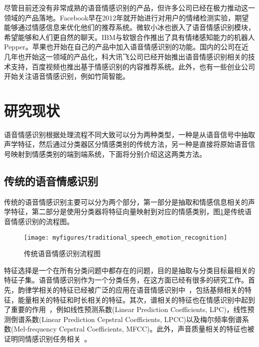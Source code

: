 尽管目前还没有非常成熟的语音情感识别的产品，但许多公司已经在极力推动这一领域的产品落地。Facebook早在2012年就开始进行对用户的情绪检测实验，期望能够通过情感信息来优化他们的推荐系统。微软小冰也嵌入了语音情感识别模块，希望能够和人们更自然的聊天。IBM与软银合作推出了具有情绪感知能力的机器人Pepper。苹果也开始在自己的产品中加入语音情感识别的功能。国内的公司在近几年也开始这一领域的产品化，科大讯飞公司已经开始推出语音情感识别相关的技术支持，百度视频也推出基于情感识别的内容推荐系统。此外，也有一些创业公司开始关注语音情感识别，例如竹简智能。

\section{研究现状}
\label{sec:status}
语音情感识别根据处理流程不同大致可以分为两种类型，一种是从语音信号中抽取声学特征，然后通过分类器区分情感类别的传统方法，另一种是直接将原始语音信号映射到情感类别的端到端系统，下面将分别介绍这这两类方法。

\subsection{传统的语音情感识别}
\label{ssec:classical_emo_rec}
传统的语音情感识别主要可以分为两个部分，第一部分是抽取和情感信息相关的声学特征，第二部分是使用分类器将特征向量映射到对应的情感类别，图\ref{fig:traditional_speech_emotion_recognition}是传统语音情感识别的流程图。

\begin{figure}[htb] %
    \centering
    \texttt{[image: myfigures/traditional\_speech\_emotion\_recognition]}
    \caption{传统语音情感识别流程图}
    \label{fig:traditional_speech_emotion_recognition}
\end{figure}

特征选择是一个在所有分类问题中都存在的问题，目的是抽取与分类目标最相关的特征子集。语音情感识别作为一个分类任务，在这方面已经有很多的研究工作。首先，韵律学相关的特征已经被广泛的应用在语音情感识别中~\cite{Cowie2002Emotion, Lee2005Toward, Murray1993Toward}，包括基频相关的特征，能量相关的特征和时长相关的特征。其次，谱相关的特征也在情感识别中起到了重要的作用~\cite{Atal1974Effectiveness, Banse1996Acoustic, Bou2000A, Hernando1997Linear, Kaiser1962Communication, Rabiner1999Fundamentals}，例如线性预测系数(Linear Prediction Coefficients, LPC)，线性预测倒谱系数(Linear Prediction Cepstral Coefficients, LPCC)以及梅尔频率倒谱系数(Mel-frequency Cepstral Coefficients, MFCC)。此外，声音质量相关的特征也被证明同情感识别任务相关~\cite{Cowie2002Emotion, Davitz1964The}。

